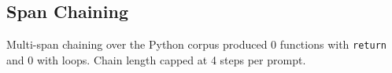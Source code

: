\subsection{Span Chaining}
Multi-span chaining over the Python corpus produced 0 functions with \texttt{return} and
0 with loops. Chain length capped at 4 steps per prompt.
